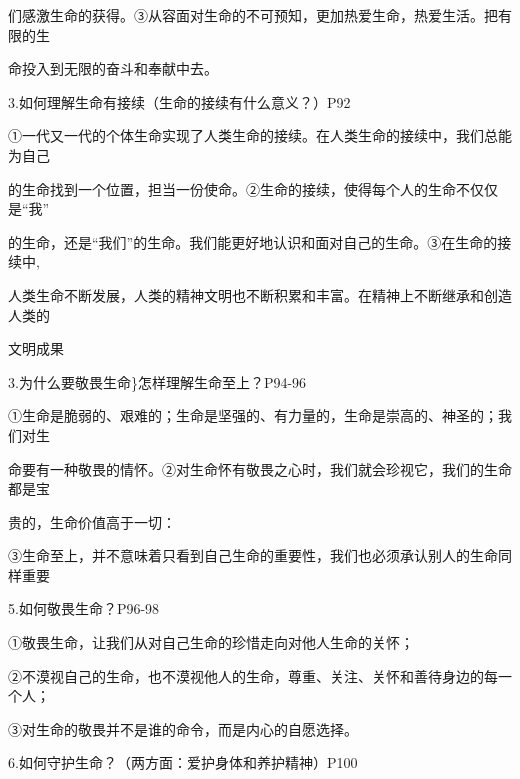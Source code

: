\documentclass[lang=cn,11pt]{elegantbook}
\newcommand{\daofasym}[1]{{\daofasymbolfont #1}}
\newcommand{\daofasym}[1]{#1}
\begin{document}
们感激生命的获得。\daofasym{③}从容面对生命的不可预知，更加热爱生命，热爱生活。把有限的生\par

命投入到无限的奋斗和奉献中去。\par

3.如何理解生命有接续（生命的接续有什么意义？）P92\par

\daofasym{①}一代又一代的个体生命实现了人类生命的接续。在人类生命的接续中，我们总能为自己\par

的生命找到一个位置，担当一份使命。\daofasym{②}生命的接续，使得每个人的生命不仅仅是“我”\par

的生命，还是“我们”的生命。我们能更好地认识和面对自己的生命。\daofasym{③}在生命的接续中,\par

人类生命不断发展，人类的精神文明也不断积累和丰富。在精神上不断继承和创造人类的\par

文明成果\par

3.为什么要敬畏生命\}怎样理解生命至上？P94-96\par

\daofasym{①}生命是脆弱的、艰难的；生命是坚强的、有力量的，生命是崇高的、神圣的；我们对生\par

命要有一种敬畏的情怀。\daofasym{②}对生命怀有敬畏之心时，我们就会珍视它，我们的生命都是宝\par

贵的，生命价值高于一切：\par

\daofasym{③}生命至上，并不意味着只看到自己生命的重要性，我们也必须承认别人的生命同样重要\par

5.如何敬畏生命？P96-98\par

\daofasym{①}敬畏生命，让我们从对自己生命的珍惜走向对他人生命的关怀；\par

\daofasym{②}不漠视自己的生命，也不漠视他人的生命，尊重、关注、关怀和善待身边的每一个人；\par

\daofasym{③}对生命的敬畏并不是谁的命令，而是内心的自愿选择。\par

6.如何守护生命？（两方面：爱护身体和养护精神）P100\par
\end{document}
